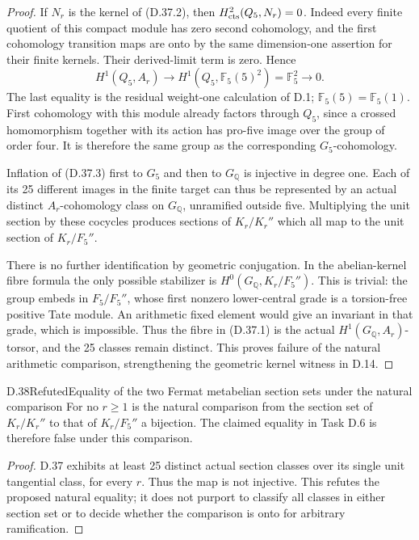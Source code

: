 \begin{proof}
If \(N_r\) is the kernel of (D.37.2),
then \(H^2_{\rm cts}(Q_5,N_r)=0\).
Indeed every finite quotient of
this compact module has zero
second cohomology, and the first
cohomology transition maps are onto
by the same dimension-one assertion
for their finite kernels. Their
derived-limit term is zero.
Hence
\[
 H^1(Q_5,A_r)\longrightarrow
             H^1(Q_5,\mathbb F_5(5)^2)
                    =\mathbb F_5^2
                    \longrightarrow0.         \tag{D.37.3}
\]
The last equality is the residual
weight-one calculation of D.1;
\(\mathbb F_5(5)=\mathbb F_5(1)\).
First cohomology with this module
already factors through \(Q_5\),
since a crossed homomorphism together
with its action has pro-five image
over the group of order four.
It is therefore the same group as
the corresponding \(G_5\)-cohomology.

Inflation of (D.37.3) first to
\(G_5\) and then to \(G_{\mathbb Q}\)
is injective in degree one.
Each of its 25 different images
in the finite target can thus be
represented by an actual distinct
\(A_r\)-cohomology class on
\(G_{\mathbb Q}\), unramified
outside five. Multiplying the unit
section by these cocycles produces
sections of \(K_r/K_r''\) which
all map to the unit section of
\(K_r/F_5''\).

There is no further identification
by geometric conjugation. In the
abelian-kernel fibre formula the
only possible stabilizer is
\(H^0(G_{\mathbb Q},K_r/F_5'')\).
This is trivial: the group embeds
in \(F_5/F_5''\), whose first
nonzero lower-central grade is a
torsion-free positive Tate module.
An arithmetic fixed element would
give an invariant in that grade,
which is impossible. Thus the
fibre in (D.37.1) is the actual
\(H^1(G_{\mathbb Q},A_r)\)-torsor,
and the 25 classes remain distinct.
This proves failure of the natural
arithmetic comparison, strengthening
the geometric kernel witness in D.14.
\end{proof}

\begin{statement}{D.38}{Refuted}{Equality of the two Fermat metabelian section sets under the natural comparison}
For no \(r\ge1\) is the natural comparison
from the section set of \(K_r/K_r''\)
to that of \(K_r/F_5''\) a bijection.
The claimed equality in Task D.6 is
therefore false under this comparison.
\end{statement}
\begin{proof}
D.37 exhibits at least 25 distinct
actual section classes over its
single unit tangential class, for
every \(r\). Thus the map is not
injective. This refutes the proposed
natural equality; it does not purport
to classify all classes in either
section set or to decide whether
the comparison is onto for arbitrary
ramification.
\end{proof}

